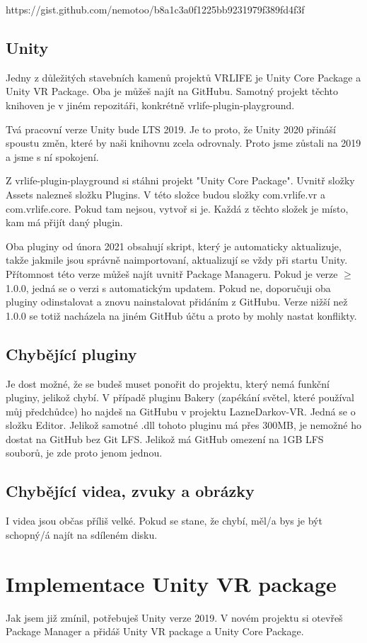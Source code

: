 \documentclass{article}
\begin{document}
https://gist.github.com/nemotoo/b8a1c3a0f1225bb9231979f389fd4f3f

\subsection{Unity}
Jedny z důležitých stavebních kamenů projektů VRLIFE je Unity Core Package a Unity VR Package. Oba je můžeš najít na GitHubu. Samotný projekt těchto knihoven je v jiném repozitáři, konkrétně vrlife-plugin-playground.

Tvá pracovní verze Unity bude LTS 2019. Je to proto, že Unity 2020 přináší spoustu změn, které by naši knihovnu zcela odrovnaly. Proto jsme zůstali na 2019 a jsme s ní spokojení.

Z vrlife-plugin-playground si stáhni projekt "Unity Core Package". Uvnitř složky Assets nalezneš složku Plugins. V této složce budou složky com.vrlife.vr a com.vrlife.core. Pokud tam nejsou, vytvoř si je. Každá z těchto složek je místo, kam má přijít daný plugin.

Oba pluginy od února 2021 obsahují skript, který je automaticky aktualizuje, takže jakmile jsou správně naimportovaní, aktualizují se vždy při startu Unity. Přítomnost této verze můžeš najít uvnitř Package Manageru. Pokud je verze $\geq$ 1.0.0, jedná se o verzi s automatickým updatem. Pokud ne, doporučuji oba pluginy odinstalovat a znovu nainstalovat přidáním z GitHubu. Verze nižší než 1.0.0 se totiž nacházela na jiném GitHub účtu a proto by mohly nastat konflikty.

\subsection{Chybějící pluginy}
Je dost možné, že se budeš muset ponořit do projektu, který nemá funkční pluginy, jelikož chybí. V případě pluginu Bakery (zapékání světel, které používal můj předchůdce) ho najdeš na GitHubu v projektu LazneDarkov-VR. Jedná se o složku Editor. Jelikož samotné .dll tohoto pluginu má přes 300MB, je nemožné ho dostat na GitHub bez Git LFS. Jelikož má GitHub omezení na 1GB LFS souborů, je zde proto jenom jednou.

\subsection{Chybějící videa, zvuky a obrázky}
I videa jsou občas příliš velké. Pokud se stane, že chybí, měl/a bys je být schopný/á najít na sdíleném disku.
\pagebreak

\section{Implementace Unity VR package}
Jak jsem již zmínil, potřebuješ Unity verze 2019. V novém projektu si otevřeš Package Manager a přidáš Unity VR package a Unity Core Package.
\end{document}
